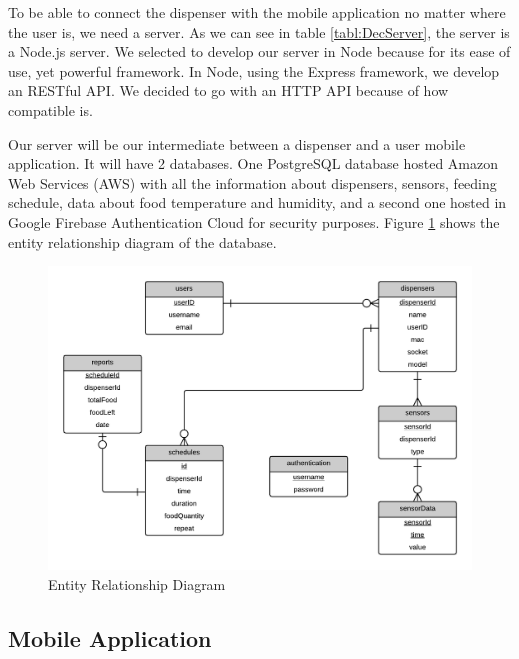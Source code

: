 \documentclass[12pt]{article}
\begin{document}
To be able to connect the dispenser with the mobile application no matter where the user is, we need a server. As we can see in table \ref{tabl:DecServer}, the server is a Node.js server. We selected to develop our server in Node because for its ease of use, yet powerful framework. In Node, using the Express framework, we develop an RESTful API. We decided to go with an HTTP API because of how compatible is.

Our server will be our intermediate between a dispenser and a user mobile application. It will have 2 databases. One PostgreSQL database hosted Amazon Web Services (AWS) with all the information about dispensers, sensors, feeding schedule, data about food temperature and humidity, and a second one hosted in Google Firebase Authentication Cloud for security purposes. Figure \ref{fig:EntityRelationship} shows the entity relationship diagram of the database.

\begin{figure}[!htb]
  \begin{center}
    \includegraphics[scale=0.35]{Figures/EntityRelationship}
  \end{center}
  \caption{Entity Relationship Diagram}
  \label{fig:EntityRelationship}
\end{figure}


\subsection{Mobile Application}
\end{document}
